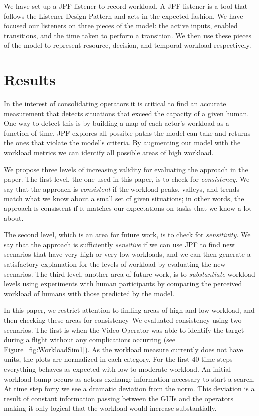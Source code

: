 \documentclass[letterpaper]{article}
\begin{document}
We have set up a JPF listener to record workload. A JPF listener is a tool that
follows the Listener Design Pattern and acts in the expected fashion. We have
focused our listeners on three pieces of the model: the active inputs, enabled
transitions, and the time taken to perform a transition. We then use these
pieces of the model to represent resource, decision, and temporal workload respectively.

\section{Results}

In the interest of consolidating operators it is critical to find an accurate measurement that detects situations that exceed the capacity of a given human. One way to detect this is by building a map of each actor's workload as a function of time. JPF explores all possible paths the model can take and returns the ones that violate the model's criteria. By augmenting our model with the workload metrics we can identify all possible areas of high workload. 

We propose three levels of increasing validity for evaluating the approach in the paper.  The first level, the one used in this paper, is to check for {\em consistency}.  We say that the approach is {\em consistent} if the workload peaks, valleys, and trends match what we know about a small set of given situations; in other words, the approach is consistent if it matches our expectations on tasks that we know a lot about.  

The second level, which is an area for future work, is to check for {\em sensitivity}.  We say that  the approach is sufficiently {\em sensitive} if we can use JPF to find new scenarios that have very high or very low workloads, and we can then generate a satisfactory explanation for the levels of workload by evaluating the new scenarios.  The third level, another area of future work, is to {\em substantiate} workload levels using experiments with human participants by comparing the perceived workload of humans with those predicted by the model.

In this paper, we restrict attention to finding areas of high and low workload, and then checking these areas for consistency.  We evaluated consistency using two scenarios.  The first is when the Video Operator was able to identify the target during a flight without any complications occurring (see Figure~\ref{fig:WorkloadSim1}). As the workload measure currently does not have units, the plots are normalized in each category. For the first 40 time steps everything behaves as expected with low to moderate workload. An initial workload bump occurs as actors exchange information necessary to start a search.   At time step forty we see a dramatic deviation from the norm. This deviation is a result of constant information passing between the GUIs and the operators
making it only
 logical that the workload would increase substantially.
\end{document}
